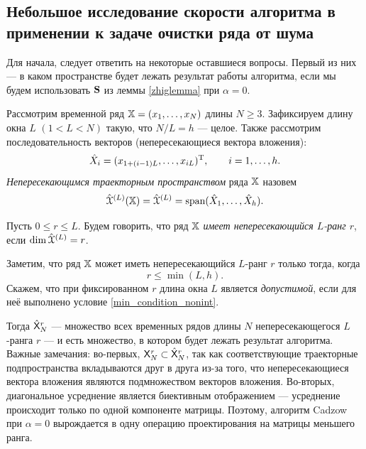 \documentclass[12pt,a4paper,fleqn,leqno]{article}
\begin{document}
\subsection{Небольшое исследование скорости алгоритма в применении к задаче очистки ряда от шума}
Для начала, следует ответить на некоторые оставшиеся вопросы. Первый из них --- в каком пространстве будет лежать результат работы алгоритма, если мы будем использовать $\mathbf{S}$ из леммы \ref{zhiglemma} при $\alpha = 0$.

Рассмотрим временной ряд $\mathbb{X} = (x_1, \ldots, x_N)$ длины $N \ge 3$. Зафиксируем длину окна $L$ $(1 < L < N)$ такую, что $N / L = h$ --- целое. Также рассмотрим последовательность векторов (непересекающиеся вектора вложения):
\begin{equation*}
\hat X_i = (x_{1 + (i-1)L}, \ldots, x_{iL})^{\mathrm{T}}, \qquad i = 1, \ldots, h.
\end{equation*}
\emph{Непересекающимся траекторным пространством} ряда $\mathbb{X}$ назовем $$\hat {\EuScript{X}}^{(L)}(\mathbb{X}) = \hat {\EuScript{X}}^{(L)} = \text{span}(\hat X_1, \ldots, \hat X_h).$$
\begin{definition}
Пусть $0 \le r \le L$. Будем говорить, что ряд $\mathbb{X}$ \emph{имеет непересекающийся $L$-ранг $r$}, если $\dim \hat {\EuScript{X}}^{(L)} = r$.
\end{definition}

Заметим, что ряд $\mathbb{X}$ может иметь непересекающийся $L$-ранг $r$ только тогда, когда
\begin{equation}
r \le \min(L, h). \label{min_condition_nonint}
\end{equation}
Скажем, что при фиксированном $r$ длина окна $L$ является \emph{допустимой}, если для неё выполнено условие \eqref{min_condition_nonint}.

Тогда $\hat {\mathsf{X}}_N^r$ --- множество всех временных рядов длины $N$ непересекающегося $L$-ранга $r$ --- и есть множество, в котором будет лежать результат алгоритма. Важные замечания: во-первых, $\mathsf{X}_N^r \subset \hat {\mathsf{X}}_N^r$, так как соответствующие траекторные подпространства вкладываются друг в друга из-за того, что непересекающиеся вектора вложения являются подмножеством векторов вложения. Во-вторых, диагональное усреднение является биективным отображением --- усреднение происходит только по одной компоненте матрицы. Поэтому, алгоритм Cadzow при $\alpha = 0$ вырождается в одну операцию проектирования на матрицы меньшего ранга.
\end{document}
